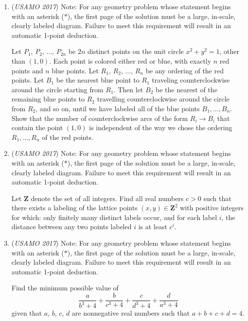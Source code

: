 \begin{enumerate}
 

	\item (\textit{USAMO 2017}) Note: For any geometry problem whose statement begins with an asterisk ($*$), the first page of the solution must be a large, in-scale, clearly labeled diagram. Failure to meet this requirement will result in an automatic 1-point deduction. 


 Let $P_1$, $P_2$, $\dots$, $P_{2n}$ be $2n$ distinct points on the unit circle $x^2+y^2=1$, other than $(1,0)$. Each point is colored either red or blue, with exactly $n$ red points and $n$ blue points. Let $R_1$, $R_2$, $\dots$, $R_n$ be any ordering of the red points. Let $B_1$ be the nearest blue point to $R_1$ traveling counterclockwise around the circle starting from $R_1$. Then let $B_2$ be the nearest of the remaining blue points to $R_2$ travelling counterclockwise around the circle from $R_2$, and so on, until we have labeled all of the blue points $B_1, \dots, B_n$. Show that the number of counterclockwise arcs of the form $R_i \to B_i$ that contain the point $(1,0)$ is independent of the way we chose the ordering $R_1, \dots, R_n$ of the red points.


 

	\item (\textit{USAMO 2017}) Note: For any geometry problem whose statement begins with an asterisk ($*$), the first page of the solution must be a large, in-scale, clearly labeled diagram. Failure to meet this requirement will result in an automatic 1-point deduction. 


 Let $\mathbf{Z}$ denote the set of all integers. Find all real numbers $c > 0$ such that there exists a labeling of the lattice points $( x, y ) \in \mathbf{Z}^2$ with positive integers for which:
only finitely many distinct labels occur, and
for each label $i$, the distance between any two points labeled $i$ is at least $c^i$.


 

	\item (\textit{USAMO 2017}) Note: For any geometry problem whose statement begins with an asterisk ($*$), the first page of the solution must be a large, in-scale, clearly labeled diagram. Failure to meet this requirement will result in an automatic 1-point deduction. 


 Find the minimum possible value of 
 \[\frac{a}{b^3+4}+\frac{b}{c^3+4}+\frac{c}{d^3+4}+\frac{d}{a^3+4}\]given that $a$, $b$, $c$, $d$ are nonnegative real numbers such that $a+b+c+d=4$.


 

\end{enumerate}